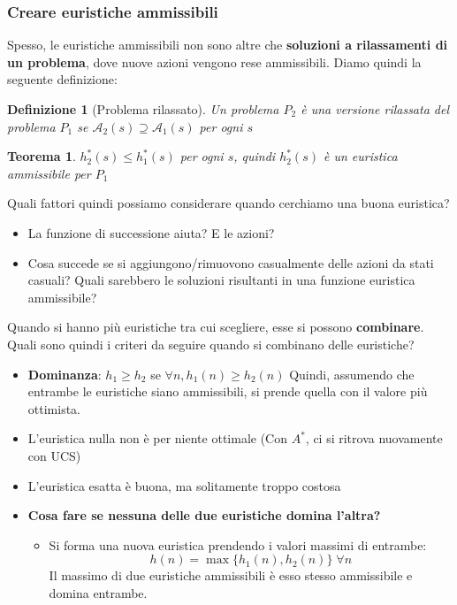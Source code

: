 \documentclass[12pt]{article}
\newtheorem{Definizione}{Definizione}[subsection]
\newtheorem{Teorema}{Teorema}[subsection]
\begin{document}
\subsubsection{Creare euristiche ammissibili}
Spesso, le euristiche ammissibili non sono altre che \textbf{soluzioni a rilassamenti di un problema}, dove nuove azioni vengono rese ammissibili.
Diamo quindi la seguente definizione:
\begin{Definizione}[Problema rilassato]
    Un problema $P_2$ è una versione rilassata del problema $P_1$ se $\mathcal{A}_2(s) \supseteq \mathcal{A}_1(s)$ per ogni $s$
\end{Definizione}
\begin{Teorema}
    $h_2^*(s) \leq h_1^*(s)$ per ogni $s$, quindi $h_2^*(s)$ è un euristica ammissibile per $P_1$
\end{Teorema}
Quali fattori quindi possiamo considerare quando cerchiamo una buona euristica?
\begin{itemize}
    \item La funzione di successione aiuta? E le azioni?
    \item Cosa succede se si aggiungono/rimuovono casualmente delle azioni da stati casuali? Quali sarebbero le soluzioni risultanti in una funzione euristica ammissibile?
\end{itemize}
Quando si hanno più euristiche tra cui scegliere, esse si possono \textbf{combinare}.
Quali sono quindi i criteri da seguire quando si combinano delle euristiche?
\begin{itemize}
    \item \textbf{Dominanza}: $h_1 \geq h_2$ se $\forall n, h_1(n) \geq h_2(n)$
    Quindi, assumendo che entrambe le euristiche siano ammissibili, si prende quella con il valore più ottimista.
    \item L'euristica nulla non è per niente ottimale (Con $A^*$, ci si ritrova nuovamente con UCS)
    \item L'euristica esatta è buona, ma solitamente troppo costosa
    \item \textbf{Cosa fare se nessuna delle due euristiche domina l'altra?}
    \begin{itemize}
        \item Si forma una nuova euristica prendendo i valori massimi di entrambe:
        $$h(n) = \max\{h_1(n), h_2(n)\} \; \forall n$$
        Il massimo di due euristiche ammissibili è esso stesso ammissibile e domina entrambe.
    \end{itemize}
\end{itemize}
\end{document}
